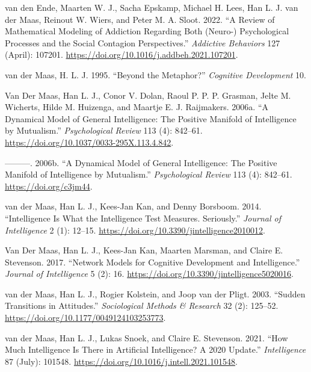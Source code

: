 \documentclass[
  a4paper,
  DIV=11,
  numbers=noendperiod]{scrreprt}
\newlength{\cslhangindent}
\newlength{\cslentryspacingunit} %
\newenvironment{CSLReferences}[2] %
 {%
  \setlength{\parindent}{0pt}
  \ifodd #1
  \let\oldpar\par
  \def\par{\hangindent=\cslhangindent\oldpar}
  \fi
  \setlength{\parskip}{#2\cslentryspacingunit}
 }%
 {}
\begin{document}
\begin{CSLReferences}{1}{0}
\leavevmode{}%
van den Ende, Maarten W. J., Sacha Epskamp, Michael H. Lees, Han L. J.
van der Maas, Reinout W. Wiers, and Peter M. A. Sloot. 2022. {``A Review
of Mathematical Modeling of Addiction Regarding Both (Neuro-)
Psychological Processes and the Social Contagion Perspectives.''}
\emph{Addictive Behaviors} 127 (April): 107201.
\url{https://doi.org/10.1016/j.addbeh.2021.107201}.

\leavevmode{}%
van der Maas, H. L. J. 1995. {``Beyond the Metaphor?''} \emph{Cognitive
Development} 10.

\leavevmode{}%
Van Der Maas, Han L. J., Conor V. Dolan, Raoul P. P. P. Grasman, Jelte
M. Wicherts, Hilde M. Huizenga, and Maartje E. J. Raijmakers. 2006a.
{``A Dynamical Model of General Intelligence: The Positive Manifold of
Intelligence by Mutualism.''} \emph{Psychological Review} 113 (4):
842--61. \url{https://doi.org/10.1037/0033-295X.113.4.842}.

\leavevmode{}%
---------. 2006b. {``A Dynamical Model of General Intelligence: {The}
Positive Manifold of Intelligence by Mutualism.''} \emph{Psychological
Review} 113 (4): 842--61. \url{https://doi.org/c3jm44}.

\leavevmode{}%
van der Maas, Han L. J., Kees-Jan Kan, and Denny Borsboom. 2014.
{``Intelligence {Is What} the {Intelligence Test Measures}.
{Seriously}.''} \emph{Journal of Intelligence} 2 (1): 12--15.
\url{https://doi.org/10.3390/jintelligence2010012}.

\leavevmode{}%
Van Der Maas, Han L. J., Kees-Jan Kan, Maarten Marsman, and Claire E.
Stevenson. 2017. {``Network {Models} for {Cognitive Development} and
{Intelligence}.''} \emph{Journal of Intelligence} 5 (2): 16.
\url{https://doi.org/10.3390/jintelligence5020016}.

\leavevmode{}%
van der Maas, Han L. J., Rogier Kolstein, and Joop van der Pligt. 2003.
{``Sudden {Transitions} in {Attitudes}.''} \emph{Sociological Methods \&
Research} 32 (2): 125--52.
\url{https://doi.org/10.1177/0049124103253773}.

\leavevmode{}%
van der Maas, Han L. J., Lukas Snoek, and Claire E. Stevenson. 2021.
{``How Much Intelligence Is There in Artificial Intelligence? {A} 2020
Update.''} \emph{Intelligence} 87 (July): 101548.
\url{https://doi.org/10.1016/j.intell.2021.101548}.


\end{CSLReferences}
\end{document}
